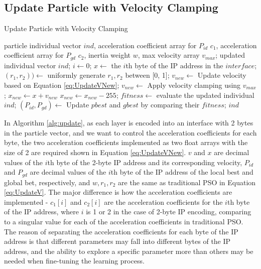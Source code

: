 \documentclass[conference]{IEEEtran}
\begin{document}
\subsection{Update Particle with Velocity Clamping}
\begin{algorithm}
	\caption{Update Particle with Velocity Clamping}
	\label{alg:update}
	\begin{algorithmic}
		\renewcommand{\algorithmicrequire}{\textbf{Input:}}
		\renewcommand{\algorithmicensure}{\textbf{Output:}}
		\REQUIRE particle individual vector $ind$, acceleration coefficient array for $P_{id}$ $c_{1}$, acceleration coefficient array for $P_{gd}$ $c_{2}$, inertia weight $w$, max velocity array $v_{max}$;
		\ENSURE updated individual vector $ind$;
			\STATE $i \leftarrow 0$;
				\STATE $x \leftarrow$ the $i$th byte of the IP address in the $interface$;
				\STATE $(r_{1}, r_{2})) \leftarrow$ uniformly generate $r_{1}, r_{2}$ between [0, 1];
				\STATE $v_{new} \leftarrow$ Update velocity based on Equation \ref{eq:UpdateVNew};
				\STATE $v_{new} \leftarrow$ Apply velocity clamping using $v_{max}$;
				\STATE $x_{new} \leftarrow x + v_{new}$
					\STATE $x_{new} \leftarrow x_{new}-255$;
				\ENDIF
			\ENDFOR
		\ENDFOR
		\STATE $fitness \leftarrow$ evaluate the updated individual $ind$;
		\STATE $(P_{id}, P_{gd}) \leftarrow$ Update $pbest$ and $gbest$ by comparing their $fitness$;
		\RETURN $ind$
	\end{algorithmic}
\end{algorithm}


In Algorithm \ref{alg:update}, as each layer is encoded into an interface with 2 bytes in the particle vector, and we want to control the acceleration coefficients for each byte, the two acceleration coefficients implemented as two float arrays with the size of 2 are required shown in Equation \ref{eq:UpdateVNew}. $v$ and $x$ are decimal values of the $i$th byte of the 2-byte IP address and its corresponding velocity, $P_{id}$ and $P_{gd}$ are decimal values of the $i$th byte of the IP address of the local best and global bet, respectively, and $w, r_{1}, r_{2}$ are the same as traditional PSO in Equation \ref{eq:UpdateV}. The major difference is how the acceleration coefficients are implemented - $c_{1}[i]$ and $c_{2}[i]$ are the acceleration coefficients for the $i$th byte of the IP address, where $i$ is 1 or 2 in the case of 2-byte IP encoding, comparing to a singular value for each of the acceleration coefficients in traditional PSO. The reason of separating the acceleration coefficients for each byte of the IP address is that different parameters may fall into different bytes of the IP address, and the ability to explore a specific parameter more than others may be needed when fine-tuning the learning process. 
\end{document}
